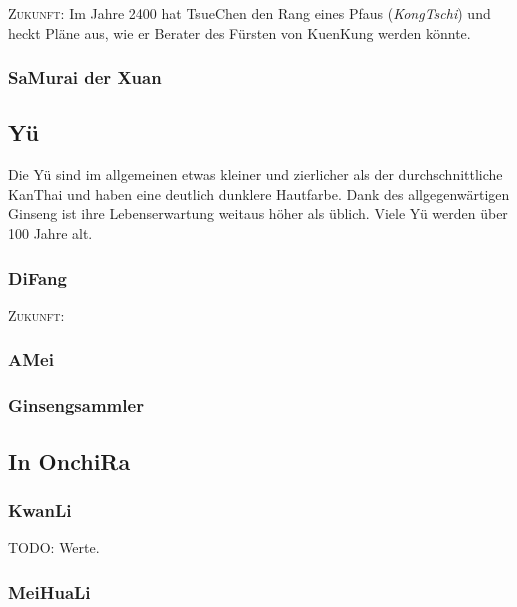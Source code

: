 \documentclass[
a4paper,
twoside,
DIV=calc,
BCOR=4mm,
fontsize=9pt,
twocolumn=on,
titlepage=on,
parskip=half
]{scrartcl}
\begin{document}
\textsc{Zukunft:} Im Jahre 2400 hat TsueChen den Rang eines Pfaus
(\emph{KongTschi}) und heckt Pläne aus, wie er Berater des Fürsten von
KuenKung werden könnte.

\subsubsection{SaMurai der Xuan}

\subsection{Yü}

Die Yü sind im allgemeinen etwas kleiner und zierlicher als der
durchschnittliche KanThai und haben eine deutlich dunklere
Hautfarbe. Dank des allgegenwärtigen Ginseng ist ihre Lebenserwartung
weitaus höher als üblich. Viele Yü werden über 100 Jahre alt.

\subsubsection{DiFang}

\textsc{Zukunft:} %

\subsubsection{AMei}


\subsubsection{Ginsengsammler}

\subsection{In OnchiRa}

\subsubsection{KwanLi}


TODO: Werte.

\subsubsection{MeiHuaLi}
\end{document}
